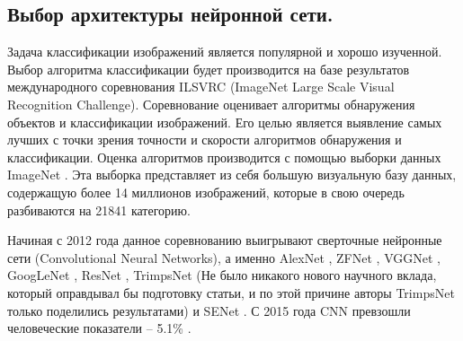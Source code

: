 \subsection{Выбор архитектуры нейронной сети.}

Задача классификации изображений является популярной и хорошо изученной. Выбор алгоритма классификации будет производится на базе результатов международного соревнования ILSVRC \cite{ILSVRC} (ImageNet Large Scale Visual Recognition Challenge). Соревнование оценивает алгоритмы обнаружения объектов и классификации изображений. Его целью является выявление самых лучших с точки зрения точности и скорости алгоритмов обнаружения и классификации. Оценка алгоритмов производится с помощью выборки данных ImageNet \cite{imagenet}. Эта выборка представляет из себя большую визуальную базу данных, содержащую более 14 миллионов изображений, которые в свою очередь разбиваются на 21841 категорию.

Начиная с 2012 года данное соревнованию выигрывают сверточные нейронные сети (Convolutional Neural Networks), а именно AlexNet \cite{alexnet}, ZFNet \cite{zfnet}, VGGNet \cite{vggnet}, GoogLeNet \cite{googlenet}, ResNet \cite{resnet}, TrimpsNet (Не было никакого нового научного вклада, который оправдывал бы подготовку статьи, и по этой причине авторы TrimpsNet только поделились результатами) и SENet \cite{senet}. С 2015 года CNN превзошли человеческие показатели -- 5.1\% \cite{human}. 

